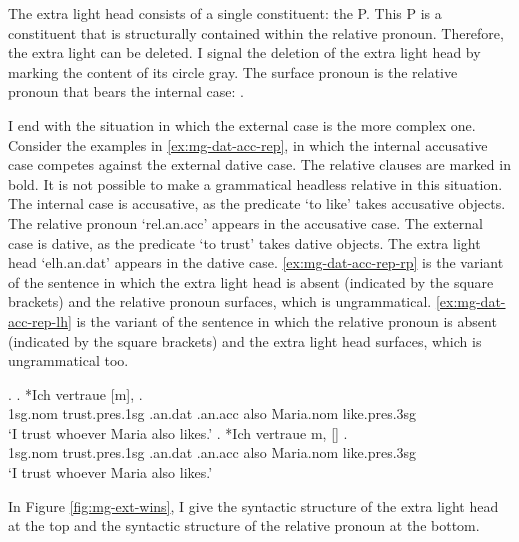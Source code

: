 The extra light head consists of a single constituent: the P.
This P is a constituent that is structurally contained within the relative pronoun. Therefore, the extra light can be deleted. I signal the deletion of the extra light head by marking the content of its circle gray.
The surface pronoun is the relative pronoun that bears the internal case: .

I end with the situation in which the external case is the more complex one.
Consider the examples in \ref{ex:mg-dat-acc-rep}, in which the internal accusative case competes against the external dative case. The relative clauses are marked in bold. It is not possible to make a grammatical headless relative in this situation.
The internal case is accusative, as the predicate  `to like' takes accusative objects. The relative pronoun  `\ac{rel}.\ac{an}.\ac{acc}' appears in the accusative case.
The external case is dative, as the predicate  `to trust' takes dative objects. The extra light head  `\ac{elh}.\ac{an}.\ac{dat}' appears in the dative case.
\ref{ex:mg-dat-acc-rep-rp} is the variant of the sentence in which the extra light head is absent (indicated by the square brackets) and the relative pronoun surfaces, which is ungrammatical.
\ref{ex:mg-dat-acc-rep-lh} is the variant of the sentence in which the relative pronoun is absent (indicated by the square brackets) and the extra light head surfaces, which is ungrammatical too.

\ex.\label{ex:mg-dat-acc-rep}
\ag. *Ich vertraue [m],    .\\
1\ac{sg}.\ac{nom} trust.\ac{pres}.1\ac{sg}\scsub{[dat]} .\ac{an}.\ac{dat} .\ac{an}.\ac{acc} also Maria.\ac{nom} like.\ac{pres}.3\ac{sg}\scsub{[acc]}\\
`I trust whoever Maria also likes.' \label{ex:mg-dat-acc-rep-rp}
\bg. *Ich vertraue m, []   .\\
1\ac{sg}.\ac{nom} trust.\ac{pres}.1\ac{sg}\scsub{[dat]} .\ac{an}.\ac{dat} .\ac{an}.\ac{acc} also Maria.\ac{nom} like.\ac{pres}.3\ac{sg}\scsub{[acc]}\\
`I trust whoever Maria also likes.' \label{ex:mg-dat-acc-rep-lh}

In Figure \ref{fig:mg-ext-wins}, I give the syntactic structure of the extra light head at the top and the syntactic structure of the relative pronoun at the bottom.

